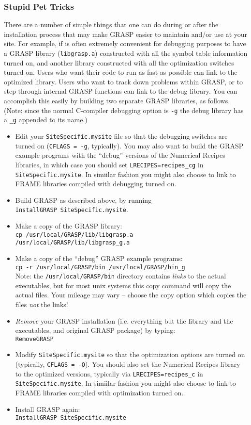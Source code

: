 \subsubsection{Stupid Pet Tricks}
There are a number of simple things that one can do during or after the
installation process that may make GRASP easier to maintain and/or use at your
site. For example, if is often extremely convenient for debugging
purposes to have a GRASP library ({\tt libgrasp.a}) constructed with all the
symbol table information turned on, and another library constructed
with all the optimization switches turned on.  Users who want their
code to run as fast as possible can link to the optimized library.
Users who want to track down problems within GRASP, or to step through
internal GRASP functions can link to the debug library.  You can accomplish this
easily by building two separate GRASP libraries, as follows.  (Note: since the
normal C-compiler debugging option is {\tt -g} the debug library has
a {\tt \_g} appended to its name.)
\begin{itemize}
\item
Edit your {\tt SiteSpecific.mysite} file so that the debugging
switches are turned on ({\tt CFLAGS = -g}, typically).  You may also
want to build the GRASP example programs with the ``debug'' versions
of the Numerical Recipes libraries, in which case you should set 
{\tt LRECIPES=recipes\_cg} in {\tt SiteSpecific.mysite}. In simiilar
fashion you might also choose to link to FRAME libraries compiled with debugging
turned on.
\item
Build GRASP as described above, by running\\
{\tt InstallGRASP SiteSpecific.mysite}.
\item
Make a copy of the GRASP library:\\
{\tt cp /usr/local/GRASP/lib/libgrasp.a
/usr/local/GRASP/lib/libgrasp\_g.a}
\item
Make a copy of the ``debug'' GRASP example programs:\\
{\tt cp -r /usr/local/GRASP/bin /usr/local/GRASP/bin\_g}\\
Note: the {\tt /usr/local/GRASP/bin} directory contains {\it links}
to the actual executables, but for most unix systems this copy command
will copy the actual files.  Your mileage may vary -- choose the copy
option
which copies the files {\it not} the links!
\item
{\it Remove} your GRASP installation (i.e. everything but the
library and the executables, and original GRASP package) by typing:\\
{\tt RemoveGRASP}
\item
Modify {\tt SiteSpecific.mysite} so that the optimization options are
turned on (typically, {\tt CFLAGS = -O}).  You should also set the
Numerical Recipes library to the optimized versions, typically via
{\tt LRECIPES=recipes\_c} in {\tt SiteSpecific.mysite}.  In simiilar
fashion you might also choose to link to FRAME libraries compiled with optimization
turned on.
\item
Install GRASP again:\\
{\tt InstallGRASP SiteSpecific.mysite}
\end{itemize}
